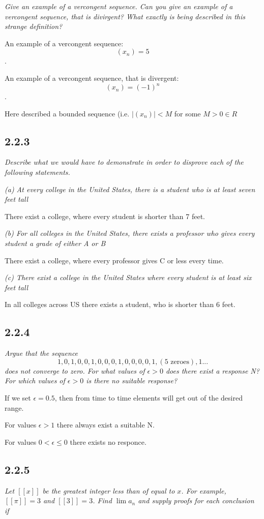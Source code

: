 \documentclass[11pt,oneside,titlepage]{book}
\begin{document}
\textit{Give an example of a vercongent sequence. Can you give an example of a vercongent
  sequence, that is divirgent? What exactly is being described in this strange definition?}

An example of a vercongent sequence:
$$(x_n) = 5$$.

An example of a vercongent sequence, that is divergent:
$$(x_n) = (-1)^n$$.

Here described a bounded sequence (i.e. $|(x_n)| < M$  for some $M > 0\in R$

\subsection*{2.2.3}
\textit{Describe what we would have to demonstrate in order to disprove each
  of the following statements.}

\textit{(a) At every college in the United States, there is a student who is at least
  seven feet tall}

There exist a college, where every student is shorter than 7 feet.

\textit{(b) For all colleges in the United States, there exists a professor who
  gives every student a grade of either A or B}

There exist a college, where every professor gives C or less every time.

\textit{(c) There exist a college in the United States where every student is at least
  six feet tall}

In all colleges across US there exists a student, who is shorter than 6 feet.

\subsection*{2.2.4}
\textit{Argue that the sequence }
$$1, 0, 1, 0, 0, 1, 0, 0, 0, 1, 0, 0, 0, 0, 1, (\text{5 zeroes}), 1...$$
\textit{
  does not converge to zero. For what values of $\epsilon > 0$ does there exist a response
  N? For which values of $\epsilon > 0$ is there no suitable response?}

If we set $\epsilon = 0.5$, then from time to time elements will get out of
the desired range.

For values $\epsilon > 1$ there always exist a suitable N.

For values $ 0 < \epsilon \leq 0$ there exists no responce.

\subsection*{2.2.5}
\textit{Let $[[x]]$ be the greatest integer less than of equal to $x$. For example,
  $[[\pi]] = 3$ and $[[3]] = 3$. Find $\lim a_n$ and supply proofs for each conclusion
  if}
\end{document}

